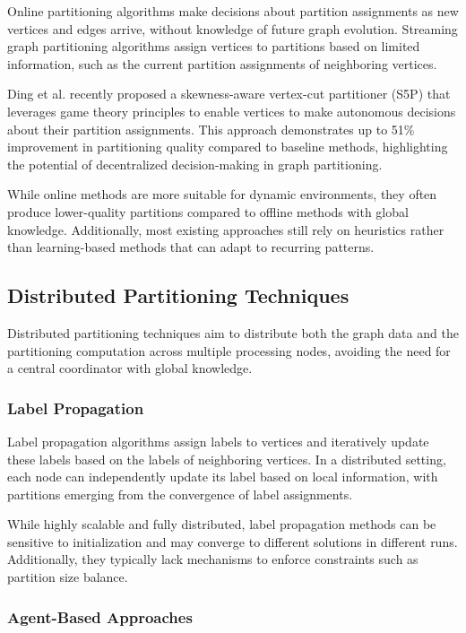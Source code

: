 \documentclass{article}
\begin{document}
Online partitioning algorithms make decisions about partition assignments as new vertices and edges arrive, without knowledge of future graph evolution. Streaming graph partitioning algorithms \cite{stanton2012streaming} assign vertices to partitions based on limited information, such as the current partition assignments of neighboring vertices.

Ding et al. \cite{ding2024play} recently proposed a skewness-aware vertex-cut partitioner (S5P) that leverages game theory principles to enable vertices to make autonomous decisions about their partition assignments. This approach demonstrates up to 51\% improvement in partitioning quality compared to baseline methods, highlighting the potential of decentralized decision-making in graph partitioning.

While online methods are more suitable for dynamic environments, they often produce lower-quality partitions compared to offline methods with global knowledge. Additionally, most existing approaches still rely on heuristics rather than learning-based methods that can adapt to recurring patterns.

\subsection{Distributed Partitioning Techniques}

Distributed partitioning techniques aim to distribute both the graph data and the partitioning computation across multiple processing nodes, avoiding the need for a central coordinator with global knowledge.

\subsubsection{Label Propagation}

Label propagation algorithms \cite{raghavan2007near} assign labels to vertices and iteratively update these labels based on the labels of neighboring vertices. In a distributed setting, each node can independently update its label based on local information, with partitions emerging from the convergence of label assignments.

While highly scalable and fully distributed, label propagation methods can be sensitive to initialization and may converge to different solutions in different runs. Additionally, they typically lack mechanisms to enforce constraints such as partition size balance.

\subsubsection{Agent-Based Approaches}
\end{document}
